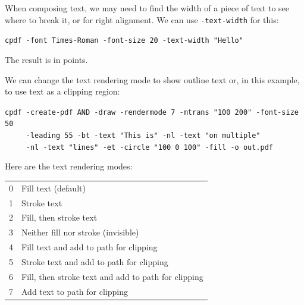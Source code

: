 \documentclass{book}
\begin{document}
\noindent When composing text, we may need to find the width of a piece of text to see where to break it, or for right alignment. We can use \texttt{-text-width} for this:

\begin{framed}
 \noindent\small\verb?cpdf -font Times-Roman -font-size 20 -text-width "Hello"?
\end{framed}

\noindent The result is in points.

We can change the text rendering mode to show outline text or, in this example, to use text as a clipping region:

\begin{framed}
 \noindent\small\verb?cpdf -create-pdf AND -draw -rendermode 7 -mtrans "100 200" -font-size 50?\\
 \noindent\small\verb?     -leading 55 -bt -text "This is" -nl -text "on multiple"?\\
 \noindent\small\verb?     -nl -text "lines" -et -circle "100 0 100" -fill -o out.pdf?
\end{framed}

\bigskip
{}
\bigskip


\noindent Here are the text rendering modes:

\bigskip
\begin{tabular}{ll}
0 & Fill text (default)\\
1 & Stroke text\\
2 & Fill, then stroke text\\
3 & Neither fill nor stroke (invisible)\\
4 & Fill text and add to path for clipping\\
5 & Stroke text and add to path for clipping\\
6 & Fill, then stroke text and add to path for clipping\\
7 & Add text to path for clipping
\end{tabular}
\bigskip
\end{document}
